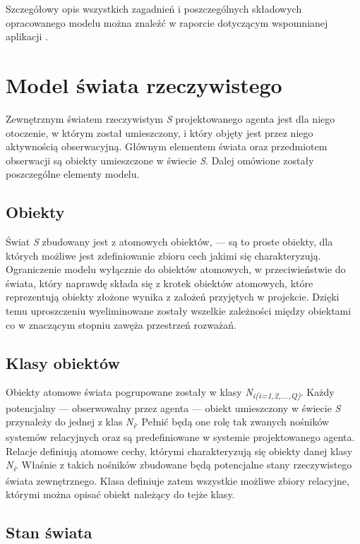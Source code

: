 Szczegółowy opis wszystkich zagadnień i poszczególnych składowych opracowanego modelu można znaleźć w raporcie dotyczącym wspomnianej aplikacji \cite{raport}.


\section{Model świata rzeczywistego}

Zewnętrznym światem rzeczywistym \textit{S} projektowanego agenta jest dla niego otoczenie, w którym został umieszczony, i który objęty jest przez niego aktywnością obserwacyjną. Głównym elementem świata oraz przedmiotem obserwacji są obiekty umieszczone w świecie \textit{S}. Dalej omówione zostały poszczególne elementy modelu.


	\subsection{Obiekty}
	
	Świat \textit{S} zbudowany jest z atomowych obiektów, --- są to proste obiekty, dla których możliwe jest zdefiniowanie zbioru cech jakimi się charakteryzują. Ograniczenie modelu wyłącznie do obiektów atomowych, w przeciwieństwie do świata, który naprawdę składa się z krotek obiektów atomowych, które reprezentują obiekty złożone wynika z założeń przyjętych w projekcie. Dzięki temu uproszczeniu wyeliminowane zostały wszelkie zależności między obiektami co w znaczącym stopniu zawęża przestrzeń rozważań.
	
	
	\subsection{Klasy obiektów}
	
	Obiekty atomowe świata pogrupowane zostały w klasy 
	\textit{N\textsubscript{i(i=1,2,...,Q)}}. 
	Każdy potencjalny --- obserwowalny przez agenta --- obiekt umieszczony w świecie \textit{S} przynależy do jednej z klas
	\textit{N\textsubscript{i}}. 
	Pełnić będą one rolę tak zwanych nośników systemów relacyjnych oraz są predefiniowane w systemie projektowanego agenta. Relacje definiują atomowe cechy, którymi charakteryzują się obiekty danej klasy 
	\textit{N\textsubscript{i}}. 
	Właśnie z takich nośników zbudowane będą potencjalne stany rzeczywistego świata zewnętrznego. Klasa definiuje zatem wszystkie możliwe zbiory relacyjne, którymi można opisać obiekt należący do tejże klasy.
	
	
	\subsection{Stan świata}
	
